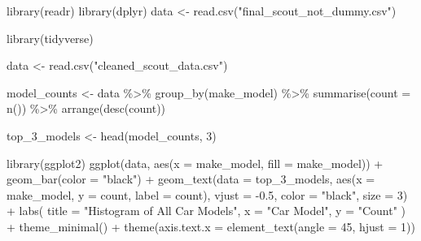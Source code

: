 \documentclass[
  letterpaper,
  DIV=11,
  numbers=noendperiod]{scrartcl}
\newenvironment{Shaded}{\begin{snugshade}}{\end{snugshade}}
\newcommand{\AttributeTok}[1]{\textcolor[rgb]{0.40,0.45,0.13}{#1}}
\newcommand{\DecValTok}[1]{\textcolor[rgb]{0.68,0.00,0.00}{#1}}
\newcommand{\FloatTok}[1]{\textcolor[rgb]{0.68,0.00,0.00}{#1}}
\newcommand{\FunctionTok}[1]{\textcolor[rgb]{0.28,0.35,0.67}{#1}}
\newcommand{\NormalTok}[1]{\textcolor[rgb]{0.00,0.23,0.31}{#1}}
\newcommand{\OtherTok}[1]{\textcolor[rgb]{0.00,0.23,0.31}{#1}}
\newcommand{\SpecialCharTok}[1]{\textcolor[rgb]{0.37,0.37,0.37}{#1}}
\newcommand{\StringTok}[1]{\textcolor[rgb]{0.13,0.47,0.30}{#1}}
\begin{document}
\begin{Shaded}
\begin{Highlighting}[]
\FunctionTok{library}\NormalTok{(readr)}
\FunctionTok{library}\NormalTok{(dplyr)}
\NormalTok{data }\OtherTok{\textless{}{-}} \FunctionTok{read.csv}\NormalTok{(}\StringTok{"final\_scout\_not\_dummy.csv"}\NormalTok{)}

\FunctionTok{library}\NormalTok{(tidyverse)}

\NormalTok{data }\OtherTok{\textless{}{-}} \FunctionTok{read.csv}\NormalTok{(}\StringTok{"cleaned\_scout\_data.csv"}\NormalTok{)}

\NormalTok{model\_counts }\OtherTok{\textless{}{-}}\NormalTok{ data }\SpecialCharTok{\%\textgreater{}\%} 
  \FunctionTok{group\_by}\NormalTok{(make\_model) }\SpecialCharTok{\%\textgreater{}\%} 
  \FunctionTok{summarise}\NormalTok{(}\AttributeTok{count =} \FunctionTok{n}\NormalTok{()) }\SpecialCharTok{\%\textgreater{}\%} 
  \FunctionTok{arrange}\NormalTok{(}\FunctionTok{desc}\NormalTok{(count))}

\NormalTok{top\_3\_models }\OtherTok{\textless{}{-}} \FunctionTok{head}\NormalTok{(model\_counts, }\DecValTok{3}\NormalTok{)}

\FunctionTok{library}\NormalTok{(ggplot2)}
\FunctionTok{ggplot}\NormalTok{(data, }\FunctionTok{aes}\NormalTok{(}\AttributeTok{x =}\NormalTok{ make\_model, }\AttributeTok{fill =}\NormalTok{ make\_model)) }\SpecialCharTok{+}
  \FunctionTok{geom\_bar}\NormalTok{(}\AttributeTok{color =} \StringTok{"black"}\NormalTok{) }\SpecialCharTok{+}
  \FunctionTok{geom\_text}\NormalTok{(}\AttributeTok{data =}\NormalTok{ top\_3\_models, }\FunctionTok{aes}\NormalTok{(}\AttributeTok{x =}\NormalTok{ make\_model, }\AttributeTok{y =}\NormalTok{ count, }\AttributeTok{label =}\NormalTok{ count), }
            \AttributeTok{vjust =} \SpecialCharTok{{-}}\FloatTok{0.5}\NormalTok{, }\AttributeTok{color =} \StringTok{"black"}\NormalTok{, }\AttributeTok{size =} \DecValTok{3}\NormalTok{) }\SpecialCharTok{+}
  \FunctionTok{labs}\NormalTok{(}
    \AttributeTok{title =} \StringTok{"Histogram of All Car Models"}\NormalTok{,}
    \AttributeTok{x =} \StringTok{"Car Model"}\NormalTok{,}
    \AttributeTok{y =} \StringTok{"Count"}
\NormalTok{  ) }\SpecialCharTok{+}
  \FunctionTok{theme\_minimal}\NormalTok{() }\SpecialCharTok{+}
  \FunctionTok{theme}\NormalTok{(}\AttributeTok{axis.text.x =} \FunctionTok{element\_text}\NormalTok{(}\AttributeTok{angle =} \DecValTok{45}\NormalTok{, }\AttributeTok{hjust =} \DecValTok{1}\NormalTok{))}



\end{Highlighting}
\end{Shaded}
\end{document}
